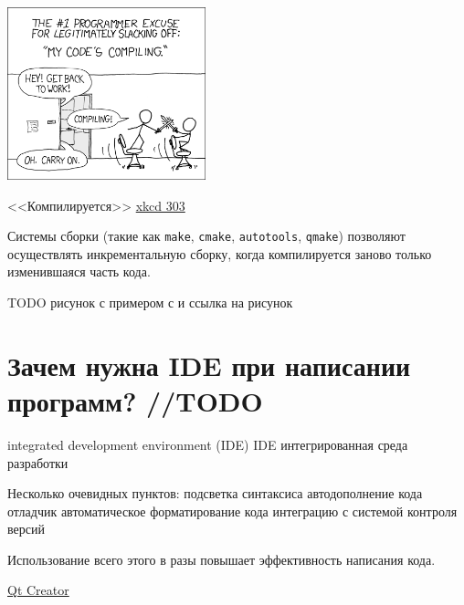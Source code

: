 \documentclass[myc.tex]{subfiles}
\begin{document}
\begin{center}
\includegraphics[height=50mm]{images/compiling.png}

<<Компилируется>> \href{https://xkcd.com/303/}{xkcd 303}
\end{center}

Системы сборки (такие как \texttt{make}, \texttt{cmake}, \texttt{autotools}, \texttt{qmake}) позволяют осуществлять инкрементальную сборку, когда компилируется заново только изменившаяся часть кода.


TODO рисунок с примером с и ссылка на рисунок






















\section{Зачем нужна IDE при написании программ? //TODO}

integrated development environment (IDE)
IDE  интегрированная среда разработки

Несколько очевидных пунктов:
подсветка синтаксиса
автодополнение кода
отладчик
автоматическое форматирование кода
интеграцию с системой контроля версий

Использование всего этого в разы повышает эффективность написания кода.


\href{https://www.qt.io/development-tools}{Qt Creator}
\end{document}

